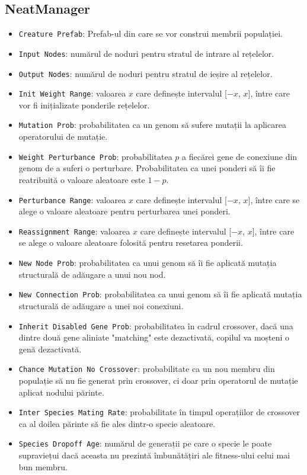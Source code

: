 \subsection{NeatManager}
\begin{itemize}
\item \texttt{Creature Prefab}: Prefab-ul din care se vor construi membrii populației.
\item \texttt{Input Nodes}: numărul de noduri pentru stratul de intrare al rețelelor.
\item \texttt{Output Nodes}: numărul de noduri pentru stratul de ieșire al rețelelor.
\item \texttt{Init Weight Range}: valoarea $x$ care definește intervalul [$-x$, $x$], între care vor fi inițializate ponderile rețelelor.
\item \texttt{Mutation Prob}: probabilitatea ca un genom să sufere mutații la aplicarea operatorului de mutație.
\item \texttt{Weight Perturbance Prob}: probabilitatea $p$ a fiecărei gene de conexiune din genom de a suferi o perturbare. Probabilitatea ca unei ponderi să îi fie reatribuită o valoare aleatoare este $1-p$.
\item \texttt{Perturbance Range}: valoarea $x$ care definește intervalul [$-x$, $x$], între care se alege o valoare aleatoare pentru perturbarea unei ponderi.
\item \texttt{Reassignment Range}: valoarea $x$ care definește intervalul [$-x$, $x$], între care se alege o valoare aleatoare folosită pentru resetarea ponderii.
\item \texttt{New Node Prob}: probabilitatea ca unui genom să îi fie aplicată mutația structurală de adăugare a unui nou nod.
\item \texttt{New Connection Prob}: probabilitatea ca unui genom să îi fie aplicată mutația structurală de adăugare a unei noi conexiuni.
\item \texttt{Inherit Disabled Gene Prob}: probabilitatea în cadrul crossover, dacă una dintre două gene aliniate "matching" este dezactivată, copilul va moșteni o genă dezactivată.
\item \texttt{Chance Mutation No Crossover}: probabilitate ca un nou membru din populație să nu fie generat prin crossover, ci doar prin operatorul de mutație aplicat nodului părinte.
\item \texttt{Inter Species Mating Rate}: probabilitate în timpul operațiilor de crossover ca al doilea părinte să fie ales dintr-o specie aleatoare.
\item \texttt{Species Dropoff Age}: numărul de generații pe care o specie le poate supraviețui dacă aceasta nu prezintă îmbunătățiri ale fitness-ului celui mai bun membru.

\end{itemize}
